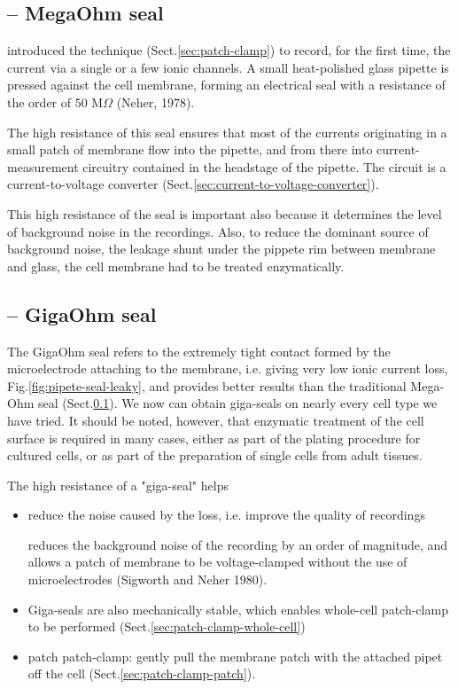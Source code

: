 \subsection{-- MegaOhm seal}
\label{sec:MegaOhm-seal}

\citep{neher1976} introduced the technique (Sect.\ref{sec:patch-clamp})  to
record, for the first time, the current via a single or a few ionic channels.
A small heat-polished glass pipette is pressed against the cell membrane,
forming an electrical seal with a resistance of the order of
50 M$\Omega$ (Neher, 1978).

The high resistance of this seal ensures that most of the currents originating
in a small patch of membrane flow into the pipette, and from there into
current-measurement circuitry contained in the headstage of the pipette. The
circuit is a current-to-voltage converter
(Sect.\ref{sec:current-to-voltage-converter}).

This high resistance of the seal is important also because it determines the
level of background noise in the recordings.
Also, to reduce the dominant source of background noise, the leakage shunt under
the pippete rim between membrane and glass, the cell membrane had to be
treated enzymatically. 

\subsection{-- GigaOhm seal}
\label{sec:GigaOhm-seal}

The GigaOhm seal refers to the extremely tight contact formed by the
microelectrode attaching to the membrane, i.e. giving very low ionic current
loss, Fig.\ref{fig:pipete-seal-leaky}, and provides better results than the
traditional Mega-Ohm seal (Sect.\ref{sec:MegaOhm-seal}).
We now can obtain giga-seals on nearly every cell type we have tried.
It should be noted, however, that enzymatic treatment of the cell surface is
required in many cases, either as part of the plating procedure for cultured
cells, or as part of the preparation of single cells from adult tissues.

The high resistance of a "giga-seal" helps
\begin{itemize}
  \item reduce the noise caused by the loss, i.e. improve the quality of
  recordings

reduces the background noise of the recording by an order of magnitude, and
allows a patch of membrane to be voltage-clamped without the use of
microelectrodes (Sigworth and Neher 1980).

  \item Giga-seals are also mechanically stable, which enables whole-cell
  patch-clamp to be performed (Sect.\ref{sec:patch-clamp-whole-cell})

  \item patch patch-clamp: gently pull the membrane patch with the attached
  pipet off the cell (Sect.\ref{sec:patch-clamp-patch}).

\end{itemize}

